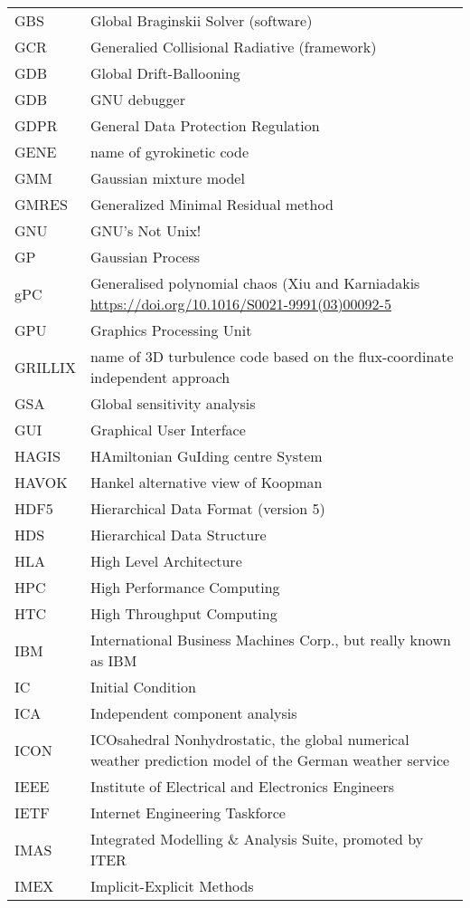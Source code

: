 \begin{longtable}{|p{4.0cm}|p{12.0cm}|}
GBS & Global Braginskii Solver (software)\\
GCR & Generalied Collisional Radiative (framework) \\
GDB & Global Drift-Ballooning \\
GDB & GNU debugger \\
GDPR & General Data Protection Regulation \\
GENE & name of gyrokinetic code \\
GMM  & Gaussian mixture model \\
GMRES & Generalized Minimal Residual method \\
GNU & GNU's Not Unix! \\
GP & Gaussian Process \\
gPC & Generalised polynomial chaos (Xiu and Karniadakis \url{https://doi.org/10.1016/S0021-9991(03)00092-5} \\
GPU & Graphics Processing Unit \\
GRILLIX & name of 3D turbulence code based on the flux-coordinate independent approach \\
GSA & Global sensitivity analysis \\
GUI & Graphical User Interface \\
HAGIS & HAmiltonian GuIding centre System\\
HAVOK  & Hankel alternative view of Koopman \\
HDF5 & Hierarchical Data Format (version 5) \\
HDS & Hierarchical Data Structure \\
HLA & High Level Architecture\\
HPC & High Performance Computing \\
HTC & High Throughput Computing \\
IBM & International Business Machines Corp., but really known as IBM \\
IC & Initial Condition \\
ICA  & Independent component analysis \\
ICON & ICOsahedral Nonhydrostatic, the global numerical weather prediction model of the German weather service \\
IEEE & Institute of Electrical and Electronics Engineers \\
IETF & Internet Engineering Taskforce \\
IMAS & Integrated Modelling \& Analysis Suite, promoted by ITER \\
IMEX & Implicit-Explicit Methods \\

\end{longtable}
